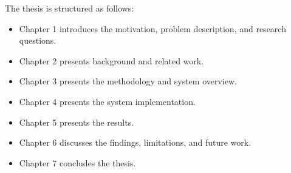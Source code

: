 The thesis is structured as follows:

\begin{itemize}
    \item Chapter 1 introduces the motivation, problem description, and research questions.
    \item Chapter 2 presents background and related work.
    \item Chapter 3 presents the methodology and system overview.
    \item Chapter 4 presents the system implementation.
    \item Chapter 5 presents the results.
    \item Chapter 6 discusses the findings, limitations, and future work.
    \item Chapter 7 concludes the thesis.
\end{itemize}





